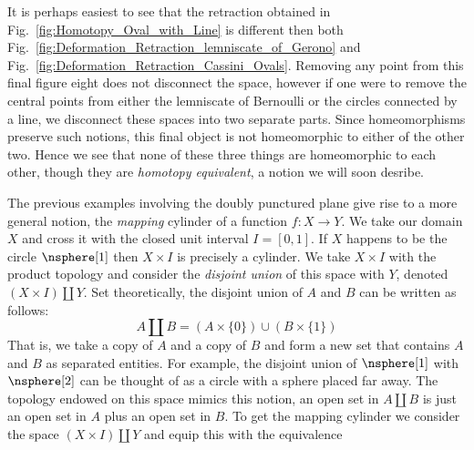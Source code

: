\documentclass[oneside]{book}                                                  %
\begin{document}
                It is perhaps easiest to see that the retraction obtained in
                Fig.~\ref{fig:Homotopy_Oval_with_Line} is different then both
                Fig.~\ref{fig:Deformation_Retraction_lemniscate_of_Gerono} and
                Fig.~\ref{fig:Deformation_Retraction_Cassini_Ovals}. Removing
                any point from this final figure eight does not disconnect the
                space, however if one were to remove the central points from
                either the lemniscate of Bernoulli or the circles connected by a
                line, we disconnect these spaces into two separate parts. Since
                homeomorphisms preserve such notions, this final object is not
                homeomorphic to either of the other two. Hence we see that none
                of these three things are homeomorphic to each other, though
                they are \textit{homotopy equivalent}, a notion we will soon
                desribe.
                \par\hfill\par
                The previous examples involving the doubly punctured plane give
                rise to a more general notion, the \textit{mapping} cylinder
                of a function $f:X\rightarrow{Y}$. We take our domain $X$ and
                cross it with the closed unit interval $I=[0,1]$. If $X$ happens
                to be the circle $\nsphere[1]$ then $X\times{I}$ is precisely a
                cylinder. We take $X\times{I}$ with the product topology and
                consider the \textit{disjoint union} of this space with $Y$,
                denoted $(X\times{I})\coprod{Y}$. Set theoretically, the
                disjoint union of $A$ and $B$ can be written as follows:
                \begin{equation}
                    \label{eqn:Def_Disjoint_Union}%
                    A\coprod{B}=(A\times\{0\})\cup(B\times\{1\})
                \end{equation}
                That is, we take a copy of $A$ and a copy of $B$ and form a
                new set that contains $A$ and $B$ as separated entities. For
                example, the disjoint union of $\nsphere[1]$ with $\nsphere[2]$
                can be thought of as a circle with a sphere placed far away. The
                topology endowed on this space mimics this notion, an open set
                in $A\coprod{B}$ is just an open set in $A$ plus an open set in
                $B$. To get the mapping cylinder we consider the space
                $(X\times{I})\coprod{Y}$ and equip this with the equivalence
\end{document}
